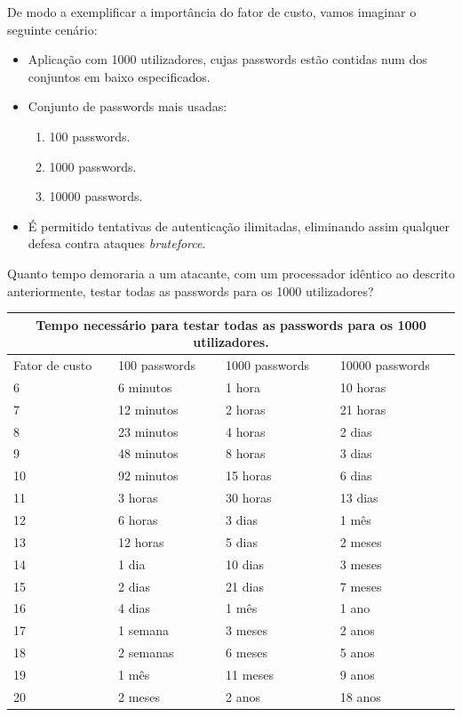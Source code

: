 De modo a exemplificar a importância do fator de custo, vamos imaginar o seguinte cenário:

\begin{itemize}
    \item Aplicação com 1000 utilizadores, cujas passwords estão contidas num dos conjuntos em baixo especificados.
    \item Conjunto de passwords mais usadas:
    \begin{enumerate}
        \item 100 passwords.
        \item 1000 passwords.
        \item 10000 passwords.
    \end{enumerate}
    \item É permitido tentativas de autenticação ilimitadas, eliminando assim qualquer defesa contra ataques \emph{bruteforce}.
\end{itemize}

Quanto tempo demoraria a um atacante, com um processador idêntico ao descrito anteriormente, testar todas as passwords para os 1000 utilizadores?

\begin{center}
    \begin{tabular}{ |p{3.2cm}|p{3cm}|p{3cm}|p{3.2cm}|  }
        \hline
        \multicolumn{4}{|c|}{Tempo necessário para testar todas as passwords para os 1000 utilizadores.} \\
        \hline
        Fator de custo & 100 passwords & 1000 passwords & 10000 passwords\\
        \hline 
        6 & 6 minutos & 1 hora & 10 horas\\
        7 & 12 minutos & 2 horas & 21 horas\\
        8 & 23 minutos & 4 horas & 2 dias\\
        9 & 48 minutos & 8 horas & 3 dias\\
        10 & 92 minutos & 15 horas & 6 dias\\
        11 & 3 horas & 30 horas & 13 dias\\
        12 & 6 horas & 3 dias & 1 mês\\
        13 & 12 horas & 5 dias & 2 meses\\
        14 & 1 dia & 10 dias & 3 meses\\
        15 & 2 dias & 21 dias & 7 meses\\
        16 & 4 dias & 1 mês & 1 ano\\
        17 & 1 semana & 3 meses & 2 anos\\
        18 & 2 semanas & 6 meses & 5 anos\\
        19 & 1 mês & 11 meses & 9 anos\\
        20 & 2 meses & 2 anos & 18 anos\\
        \hline
    \end{tabular}
\label{tab:bcrypt_bruteforce} 
\end{center}


